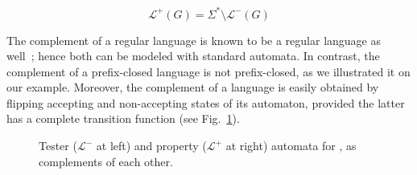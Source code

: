 \begin{equation}
\mathcal{L}^{+}(G) = \Sigma^{*} \setminus \mathcal{L}^{-}(G)
\end{equation}

The complement of a regular language is known to be a regular language as well~\cite{Hopcroft:1979}; hence both can be modeled with standard automata. In contrast, the complement of a prefix-closed language is not prefix-closed, as we illustrated it on our example. Moreover, the complement of a language is easily obtained by flipping accepting and non-accepting states of its automaton, provided the latter has a complete transition function (see Fig.~\ref{image:tester-and-property-automata}). 

\begin{figure}[H]\centering
{}
\caption{Tester ($\mathcal{L}^{-}$ at left) and property ($\mathcal{L}^{+}$ at right) automata for , as complements of each other.\label{image:tester-and-property-automata}}
\end{figure}

